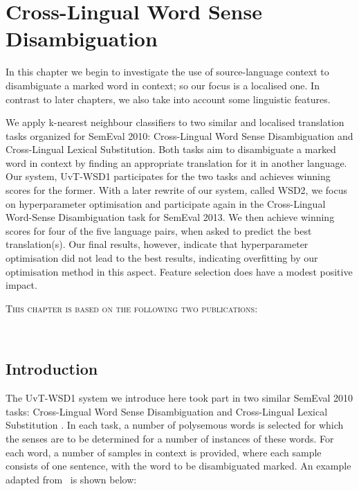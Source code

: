 \chapter{Cross-Lingual Word Sense Disambiguation}
\label{chap:clwsd}

In this chapter we begin to investigate the use of source-language context to disambiguate a marked word in context; so
our focus is a localised one. In contrast to later chapters, we also take into account some linguistic features.

We apply k-nearest neighbour classifiers to two similar and localised translation tasks organized for SemEval 2010:
Cross-Lingual Word Sense Disambiguation and Cross-Lingual Lexical Substitution.  Both tasks aim to disambiguate a marked
word in context by finding an appropriate translation for it in another language. Our system, UvT-WSD1 participates for
the two tasks and achieves winning scores for the former. With a later rewrite of our system, called WSD2, we focus on
hyperparameter optimisation and participate again in the Cross-Lingual Word-Sense Disambiguation task for SemEval 2013.
We then achieve winning scores for four of the five language pairs, when asked to predict the best translation(s). Our
final results, however, indicate that hyperparameter optimisation did not lead to the best results, indicating
overfitting by our optimisation method in this aspect. Feature selection does have a modest positive impact.


\nobibliography*
\textsc{This chapter is based on the following two publications: }
\begin{NoHyper} \\
\end{NoHyper}




\section{Introduction}

The UvT-WSD1 system we introduce here took part in two similar SemEval 2010
tasks: Cross-Lingual Word Sense Disambiguation \citep{WSD} and Cross-Lingual
Lexical Substitution \citep{CLLS}. In each task, a number of polysemous words is
selected for which the senses are to be determined for a number of instances of
these words. For each word, a number of samples in context is provided, where
each sample consists of one sentence, with the word to be disambiguated marked. An example adapted from~\cite{WSD} is shown below:


